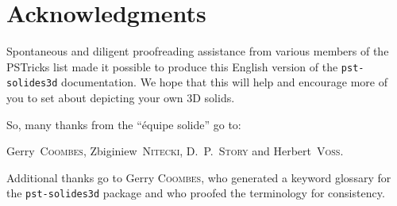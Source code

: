 \section{Acknowledgments}

Spontaneous and diligent proofreading assistance from various
members of the PSTricks list made it possible to produce this
English version of the \texttt{pst-solides3d} documentation. We
hope that this will help and encourage more of you to set about
depicting your own 3D solids.

So, many thanks from the ``\'{e}quipe solide'' go to: %

Gerry~\textsc{Coombes},
Zbiginiew~\textsc{Nitecki},
D.~P.~\textsc{Story} and
Herbert~\textsc{Voss}.

Additional thanks go to Gerry \textsc{Coombes}, who generated a keyword glossary
for the \texttt{pst-solides3d} package and who proofed the terminology for consistency.

\endinput
